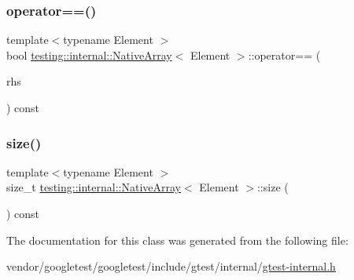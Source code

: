 \subsubsection{\texorpdfstring{operator==()}{operator==()}}
{\footnotesize\ttfamily template$<$typename Element $>$ \\
bool \hyperlink{classtesting_1_1internal_1_1_native_array}{testing\+::internal\+::\+Native\+Array}$<$ Element $>$\+::operator== (\begin{DoxyParamCaption}\item[{const \hyperlink{classtesting_1_1internal_1_1_native_array}{Native\+Array}$<$ Element $>$ \&}]{rhs }\end{DoxyParamCaption}) const\hspace{0.3cm}{\ttfamily [inline]}}

\mbox{\label{classtesting_1_1internal_1_1_native_array_af96a4a5ca0cdd5d163c47a081f08bd89}} 
\subsubsection{\texorpdfstring{size()}{size()}}
{\footnotesize\ttfamily template$<$typename Element $>$ \\
size\+\_\+t \hyperlink{classtesting_1_1internal_1_1_native_array}{testing\+::internal\+::\+Native\+Array}$<$ Element $>$\+::size (\begin{DoxyParamCaption}{ }\end{DoxyParamCaption}) const\hspace{0.3cm}{\ttfamily [inline]}}



The documentation for this class was generated from the following file\+:\begin{DoxyCompactItemize}
\item 
vendor/googletest/googletest/include/gtest/internal/\hyperlink{gtest-internal_8h}{gtest-\/internal.\+h}\end{DoxyCompactItemize}
